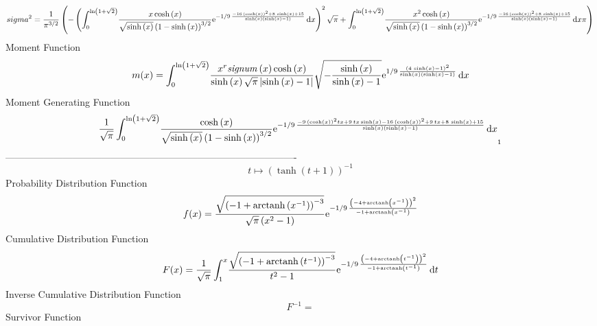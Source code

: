 \documentclass[12pt]{article}
\begin{document}
 $$ sigma^2 = {\frac {1}{{\pi}^{3/2}} \left( - \left( \int_{0}^{\ln  \left( 1+\sqrt 
{2} \right) }\!{\frac {x\cosh \left( x \right) }{\sqrt {\sinh \left( x
 \right) } \left( 1-\sinh \left( x \right)  \right) ^{3/2}}{{\rm e}^{-
1/9\,{\frac {-16\, \left( \cosh \left( x \right)  \right) ^{2}+8\,
\sinh \left( x \right) +15}{\sinh \left( x \right)  \left( \sinh
 \left( x \right) -1 \right) }}}}}\,{\rm d}x \right) ^{2}\sqrt {\pi}+
\int_{0}^{\ln  \left( 1+\sqrt {2} \right) }\!{\frac {{x}^{2}\cosh
 \left( x \right) }{\sqrt {\sinh \left( x \right) } \left( 1-\sinh
 \left( x \right)  \right) ^{3/2}}{{\rm e}^{-1/9\,{\frac {-16\,
 \left( \cosh \left( x \right)  \right) ^{2}+8\,\sinh \left( x
 \right) +15}{\sinh \left( x \right)  \left( \sinh \left( x \right) -1
 \right) }}}}}\,{\rm d}x\pi \right) }
$$Moment Function 
 $$ m(x) = \int_{0}^{\ln  \left( 1+\sqrt {2} \right) }\!{\frac {{x}^{r}{\it 
signum} \left( x \right) \cosh \left( x \right) }{\sinh \left( x
 \right) \sqrt {\pi} \left| \sinh \left( x \right) -1 \right| }\sqrt {
-{\frac {\sinh \left( x \right) }{\sinh \left( x \right) -1}}}{{\rm e}
^{1/9\,{\frac { \left( 4\,\sinh \left( x \right) -1 \right) ^{2}}{
\sinh \left( x \right)  \left( \sinh \left( x \right) -1 \right) }}}}}
\,{\rm d}x
$$ Moment Generating Function 
 $${\frac {1}{\sqrt {\pi}}\int_{0}^{\ln  \left( 1+\sqrt {2} \right) }\!{
\frac {\cosh \left( x \right) }{\sqrt {\sinh \left( x \right) }
 \left( 1-\sinh \left( x \right)  \right) ^{3/2}}{{\rm e}^{-1/9\,{
\frac {-9\, \left( \cosh \left( x \right)  \right) ^{2}tx+9\,tx\sinh
 \left( x \right) -16\, \left( \cosh \left( x \right)  \right) ^{2}+9
\,tx+8\,\sinh \left( x \right) +15}{\sinh \left( x \right)  \left( 
\sinh \left( x \right) -1 \right) }}}}}\,{\rm d}x}_{{1}}
$$-------------------------------------------------------------------------------------------  \\$$t\mapsto  \left( \tanh \left( t+1 \right)  \right) ^{-1}
$$Probability Distribution Function 
$$  f(x)={\frac {\sqrt { \left( -1+{\rm arctanh} \left({x}^{-1}\right) \right) 
^{-3}}}{\sqrt {\pi} \left( {x}^{2}-1 \right) }{{\rm e}^{-1/9\,{\frac {
 \left( -4+{\rm arctanh} \left({x}^{-1}\right) \right) ^{2}}{-1+
{\rm arctanh} \left({x}^{-1}\right)}}}}}
$$Cumulative Distribution Function  
 $$F(x)={\frac {1}{\sqrt {\pi}}\int_{1}^{x}\!{\frac {\sqrt { \left( -1+
{\rm arctanh} \left({t}^{-1}\right) \right) ^{-3}}}{{t}^{2}-1}{{\rm e}
^{-1/9\,{\frac { \left( -4+{\rm arctanh} \left({t}^{-1}\right)
 \right) ^{2}}{-1+{\rm arctanh} \left({t}^{-1}\right)}}}}}\,{\rm d}t}
$$ Inverse Cumulative Distribution Function 
  $$F^{-1} = $$Survivor Function 
\end{document}
